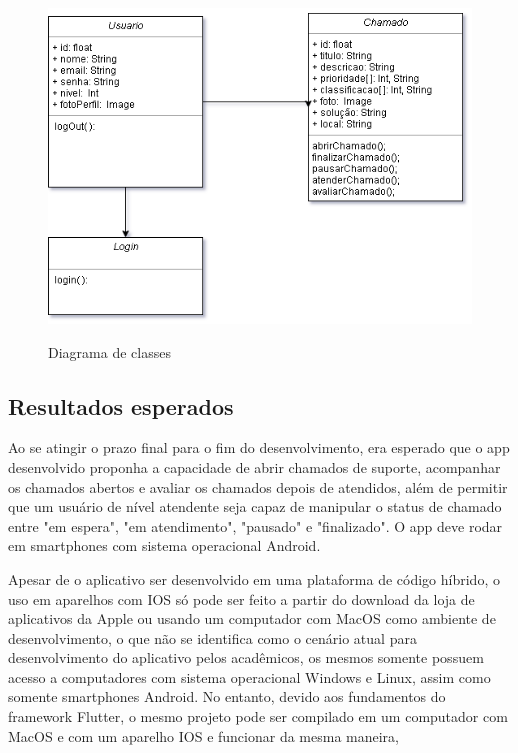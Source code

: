 \begin{figure}[htb]
     \caption{Diagrama de classes}
     \centering
     \begin{frame}{
     \includegraphics [scale = 0.83]{img/Diagramas/diagrama_classes.png}}
     \end{frame}
     \label{fig:diagrama_classes}
 \end{figure}
\newpage

\subsection{Resultados esperados}
Ao se atingir o prazo final para o fim do desenvolvimento, era esperado que o app desenvolvido proponha a capacidade de abrir chamados de suporte, acompanhar os chamados abertos e avaliar os chamados depois de atendidos, além de permitir que um usuário de nível atendente seja capaz de manipular o status de chamado entre "em espera", "em atendimento", "pausado" e "finalizado". O app deve rodar em smartphones com sistema operacional Android. 

Apesar de o aplicativo ser desenvolvido em uma plataforma de código híbrido, o uso em aparelhos com IOS só pode ser feito a partir do download da loja de aplicativos da Apple ou usando um computador com MacOS como ambiente de desenvolvimento, o que não se identifica como o cenário atual para desenvolvimento do aplicativo pelos acadêmicos, os mesmos somente possuem acesso a computadores com sistema operacional Windows e Linux, assim como somente smartphones Android. No entanto, devido aos fundamentos do framework Flutter, o mesmo projeto pode ser compilado em um computador com MacOS e com um aparelho IOS e funcionar da mesma maneira,  

